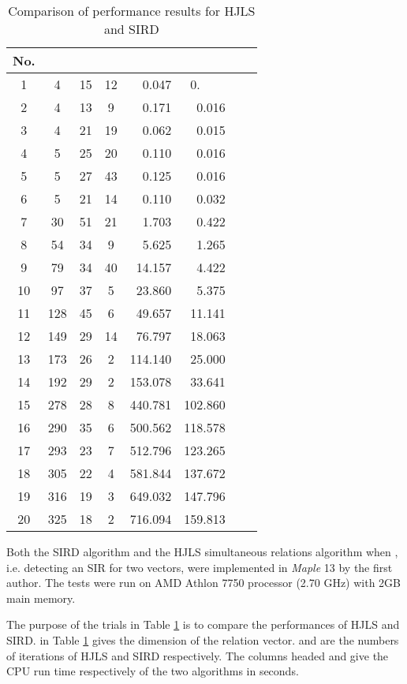 \documentclass{sig-alternate}
\numberwithin{theorem}{section} \numberwithin{equation}{section}
\begin{document}
\begin{table}[H]\centering
\begin{tabular}{||c|c|c|c|c|c|c|c|}
  \hline
No.&    &  &  &  & 
 \\\hline\hline
  1&4&15&12&\ \ 0.047&0.\ \ \  \\
 2&4&13&9&\ \ 0.171&\ \ 0.016\\
 3&4&21&19&\ \ 0.062&\ \ 0.015\\
 4&5&25&20&\ \ 0.110&\ \ 0.016\\
 5&5&27&43&\ \ 0.125&\ \ 0.016\\
 6& 5 &   21 & 14 & \ \ 0.110 & \ \ 0.032 \\\hline
7& 30 &  51 & 21 & \ \ 1.703 & \ \ 0.422 \\
  8&54 & 34 & 9 & \ \ 5.625 & \ \ 1.265 \\
   9&79  & 34 & 40 & \ 14.157 & \ \ 4.422 \\
  10&97 &  37 & 5 & \ 23.860 & \ \ 5.375 \\
  11&128 &  45 & 6 & \ 49.657 & \ 11.141 \\
  12&149 &   29 & 14 & \ 76.797 & \ 18.063 \\
   13&173 & 26 & 2 & 114.140 & \ 25.000 \\
  14&192 &  29 & 2 & 153.078 & \ 33.641 \\
  15&278& 28 & 8 & 440.781 & 102.860  \\
   16&290 & 35 & 6 & 500.562 & 118.578  \\
   17&293 & 23 & 7 & 512.796 & 123.265  \\
   18&305 & 22 & 4 & 581.844 & 137.672  \\
   19&316 & 19 & 3 & 649.032 & 147.796  \\
  20&325 & 18 & 2 & 716.094 & 159.813  \\
  \hline
\end{tabular}\caption{Comparison of performance results for HJLS and SIRD }\label{tab:performance-of-SIRD}
\end{table}

 Both the SIRD algorithm and the HJLS simultaneous relations
algorithm when , i.e. detecting an SIR for two vectors, were
implemented in \emph{Maple} 13 by the first author.  The tests were
run on AMD Athlon 7750 processor (2.70 GHz) with
2GB main memory.

The purpose of the trials in Table \ref{tab:performance-of-SIRD} is
to compare the performances of HJLS and SIRD.   in Table
\ref{tab:performance-of-SIRD} gives the dimension of the relation
vector.  and  are the numbers of iterations
of HJLS and SIRD respectively. The columns headed  and
 give the CPU run time respectively of the two algorithms
in seconds. 
\end{document}
